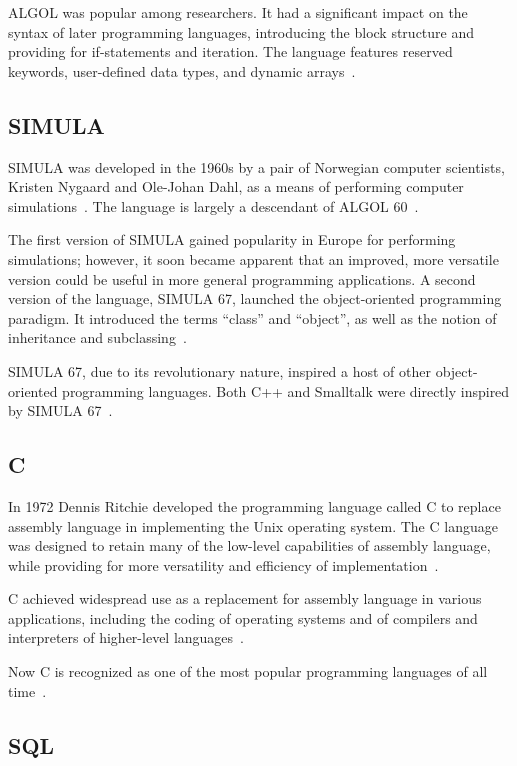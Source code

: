\documentclass{article}
\begin{document}
ALGOL was popular among researchers. It had a significant impact on the syntax of later programming languages, introducing the block structure and providing for if-statements and iteration. The language features reserved keywords, user-defined data types, and dynamic arrays~\cite{algol1}.

\subsection{SIMULA}

SIMULA was developed in the 1960s by a pair of Norwegian computer scientists, Kristen Nygaard and Ole-Johan Dahl, as a means of performing computer simulations~\cite{simula1}. The language is largely a descendant of ALGOL 60~\cite{simula2}.

The first version of SIMULA gained popularity in Europe for performing simulations; however, it soon became apparent that an improved, more versatile version could be useful in more general programming applications. A second version of the language, SIMULA 67, launched the object-oriented programming paradigm. It introduced the terms ``class'' and ``object'', as well as the notion of inheritance and subclassing~\cite{simula1}.

SIMULA 67, due to its revolutionary nature, inspired a host of other object-oriented programming languages. Both C++ and Smalltalk were directly inspired by SIMULA 67~\cite{simula3}.

\subsection{C}

In 1972 Dennis Ritchie developed the programming language called C to replace assembly language in implementing the Unix operating system. The C language was designed to retain many of the low-level capabilities of assembly language, while providing for more versatility and efficiency of implementation~\cite{c1}.

C achieved widespread use as a replacement for assembly language in various applications, including the coding of operating systems and of compilers and interpreters of higher-level languages~\cite{c2}.

Now C is recognized as one of the most popular programming languages of all time~\cite{tiobe1}.

\subsection{SQL}
\end{document}
